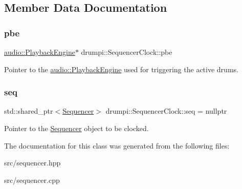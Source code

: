 \subsection{Member Data Documentation}
\mbox{\label{classdrumpi_1_1SequencerClock_ae3ec41e6da35975b98942f110dc0e6dc}} 
\subsubsection{\texorpdfstring{pbe}{pbe}}
{\footnotesize\ttfamily \hyperlink{classdrumpi_1_1audio_1_1PlaybackEngine}{audio\+::\+Playback\+Engine}$\ast$ drumpi\+::\+Sequencer\+Clock\+::pbe\hspace{0.3cm}{\ttfamily [private]}}

Pointer to the \hyperlink{classdrumpi_1_1audio_1_1PlaybackEngine}{audio\+::\+Playback\+Engine} used for triggering the active drums. \mbox{\label{classdrumpi_1_1SequencerClock_aa6dc6e6c44fd5ba2e3a5456db8692915}} 
\subsubsection{\texorpdfstring{seq}{seq}}
{\footnotesize\ttfamily std\+::shared\+\_\+ptr$<$\hyperlink{classdrumpi_1_1Sequencer}{Sequencer}$>$ drumpi\+::\+Sequencer\+Clock\+::seq = nullptr\hspace{0.3cm}{\ttfamily [private]}}

Pointer to the \hyperlink{classdrumpi_1_1Sequencer}{Sequencer} object to be clocked. 

The documentation for this class was generated from the following files\+:\begin{DoxyCompactItemize}
\item 
src/sequencer.\+hpp\item 
src/sequencer.\+cpp\end{DoxyCompactItemize}

